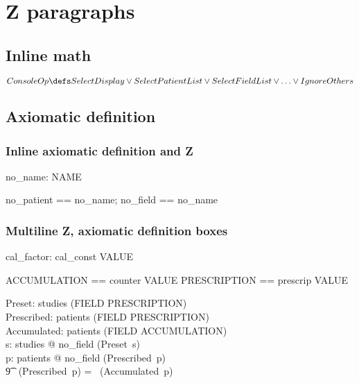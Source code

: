 \section*{Z paragraphs} %

\subsection{Inline math}


\[ ConsoleOp \defs SelectDisplay \lor SelectPatientList \lor SelectFieldList \lor  \ldots \lor IgnoreOthers \]

\subsection{Axiomatic definition}

\subsubsection{Inline axiomatic definition and Z} \label{sect:inline-axdef}

\begin{axdef} no\_name: NAME \end{axdef}
\begin{zed} no\_patient == no\_name; no\_field == no\_name \end{zed}

\subsubsection{Multiline Z, axiomatic definition boxes}

\begin{axdef}
	cal\_factor: cal\_const \fun VALUE
\end{axdef}

\begin{zed}
	ACCUMULATION == counter \fun VALUE
\also
 	PRESCRIPTION == prescrip \fun VALUE
\end{zed}

\begin{axdef}	
	Preset: studies \fun (FIELD \pfun PRESCRIPTION) \\
	Prescribed: patients \fun (FIELD \pfun PRESCRIPTION) \\
	Accumulated: patients \fun (FIELD \pfun ACCUMULATION) \\
\where
	\forall s: studies @ no\_field \notin \dom (Preset~s) \\
	\forall p: patients @ no\_field \notin \dom (Prescribed~p) \\
\t9		\land \dom~(Prescribed~p) = \dom~(Accumulated~p) 
\end{axdef}

